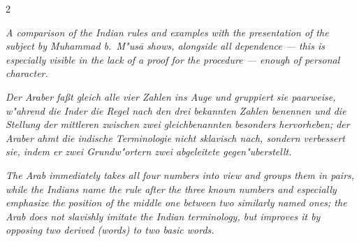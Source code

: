 \documentclass[10pt,a4paper]{article}
\begin{document}
\begin{paracol}{2}
\switchcolumn

\textit{A comparison of the Indian rules and examples with the presentation of the subject by Muhammad b.\ M"us\=a shows, alongside all dependence --- this is especially visible in the lack of a proof for the procedure --- enough of personal character.}

\switchcolumn*

\textit{Der Araber fa\ss{}t gleich alle vier Zahlen ins Auge und gruppiert sie paarweise, w"ahrend die Inder die Regel nach den drei bekannten Zahlen benennen und die Stellung der mittleren zwischen zwei gleichbenannten besonders hervorheben; der Araber ahmt die indische Terminologie nicht sklavisch nach, sondern verbessert sie, indem er zwei Grundw"ortern zwei abgeleitete gegen"uberstellt.}

\switchcolumn

\textit{The Arab immediately takes all four numbers into view and groups them in pairs, while the Indians name the rule after the three known numbers and especially emphasize the position of the middle one between two similarly named ones; the Arab does not slavishly imitate the Indian terminology, but improves it by opposing two derived (words) to two basic words.}

\end{paracol}

\clearpage
\end{document}
